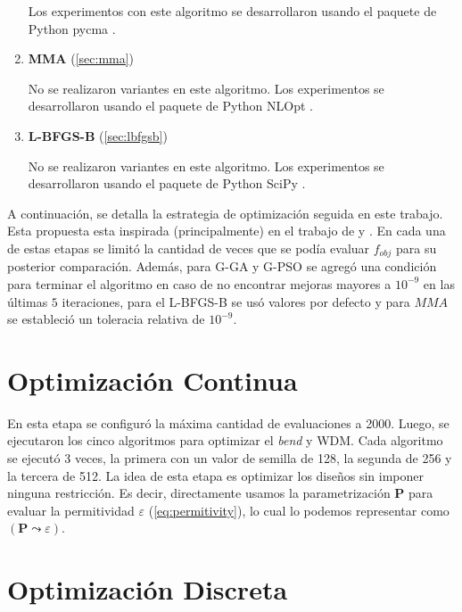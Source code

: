\begin{enumerate}
  Los experimentos con este algoritmo se desarrollaron usando el paquete de Python pycma
  \citep{hansen2019pycma}.

  \item \textbf{MMA} (\autoref{sec:mma})

  No se realizaron variantes en este algoritmo.
  Los experimentos se desarrollaron usando el paquete de Python NLOpt \citep{nlopt}.

  \item \textbf{L-BFGS-B} (\autoref{sec:lbfgsb})

  No se realizaron variantes en este algoritmo.
  Los experimentos se desarrollaron usando el paquete de Python SciPy \citep{2020SciPy-NMeth}.

\end{enumerate}

A continuación, se detalla la estrategia de optimización seguida en este trabajo.
Esta propuesta esta inspirada (principalmente) en el trabajo de \cite{Su2020} y \cite{Christiansen2021}.
En cada una de estas etapas se limitó la cantidad de veces que se podía evaluar $f_{obj}$ para su
posterior comparación. Además, para G-GA y G-PSO se agregó una condición para terminar el algoritmo
en caso de no encontrar mejoras mayores a $10^{-9}$ en las últimas $5$ iteraciones, 
para el L-BFGS-B se usó valores por defecto y para $MMA$ se estableció un toleracia relativa de $10^{-9}$.

\section{Optimización Continua}

En esta etapa se configuró la máxima cantidad de evaluaciones a 2000.
Luego, se ejecutaron los cinco algoritmos para optimizar el \emph{bend} y WDM.
Cada algoritmo se ejecutó 3 veces, la primera con un valor de semilla de 128, la segunda de 256 y
la tercera de 512.
La idea de esta etapa es optimizar los diseños sin imponer ninguna restricción.
Es decir, directamente usamos la parametrización $\boldsymbol{P}$ para evaluar la permitividad 
$\varepsilon$ (\autoref{eq:permitivity}),
lo cual lo podemos representar como $(\boldsymbol{P} \mathrel{\leadsto} \varepsilon)$.

\section{Optimización Discreta}


